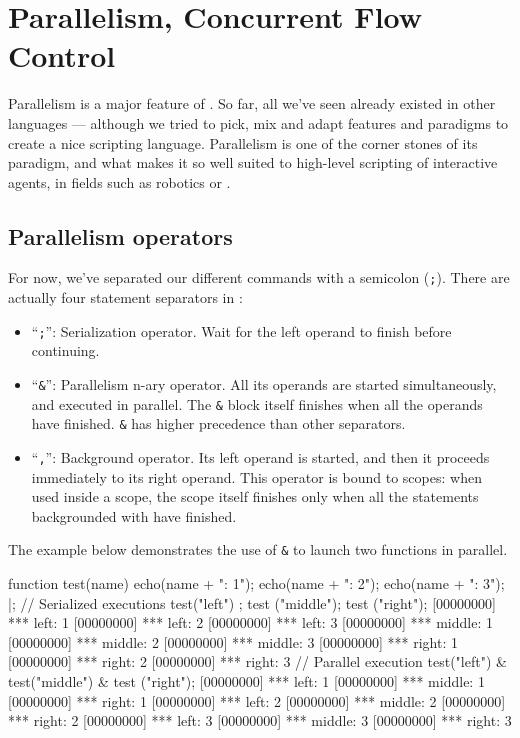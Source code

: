 
\chapter{Parallelism, Concurrent Flow Control}
\label{sec:tut:concurrent}

Parallelism is a major feature of \us. So far, all we've
seen already existed in other languages --- although we tried to pick,
mix and adapt features and paradigms to create a nice scripting
language. Parallelism is one of the corner stones of its paradigm, and
what makes it so well suited to high-level scripting of interactive
agents, in fields such as robotics or \ai.

\section{Parallelism operators}

For now, we've separated our different commands with a semicolon
(\lstinline{;}). There are actually four statement separators in \us:

\begin{itemize}
\item ``\lstinline{;}'': Serialization operator. Wait for the left
  operand to finish before continuing.
\item ``\lstinline{&}'': Parallelism n-ary operator. All its operands are
  started simultaneously, and executed in parallel. The \lstinline{&} block
  itself finishes when all the operands have finished. \lstinline{&} has
  higher precedence than other separators.
\item ``\lstinline{,}'': Background operator. Its left operand is started,
  and then it proceeds immediately to its right operand.  This operator is
  bound to scopes: when used inside a scope, the scope itself finishes only
  when all the statements backgrounded with \samp{,} have finished.
\end{itemize}

The example below demonstrates the use of \lstinline{&} to launch two
functions in parallel.

\begin{urbiscript}[firstnumber=1]
function test(name)
{
  echo(name + ": 1");
  echo(name + ": 2");
  echo(name + ": 3");
} |;
// Serialized executions
test("left") ; test ("middle"); test ("right");
[00000000] *** left: 1
[00000000] *** left: 2
[00000000] *** left: 3
[00000000] *** middle: 1
[00000000] *** middle: 2
[00000000] *** middle: 3
[00000000] *** right: 1
[00000000] *** right: 2
[00000000] *** right: 3
// Parallel execution
test("left") & test("middle") & test ("right");
[00000000] *** left: 1
[00000000] *** middle: 1
[00000000] *** right: 1
[00000000] *** left: 2
[00000000] *** middle: 2
[00000000] *** right: 2
[00000000] *** left: 3
[00000000] *** middle: 3
[00000000] *** right: 3
\end{urbiscript}

